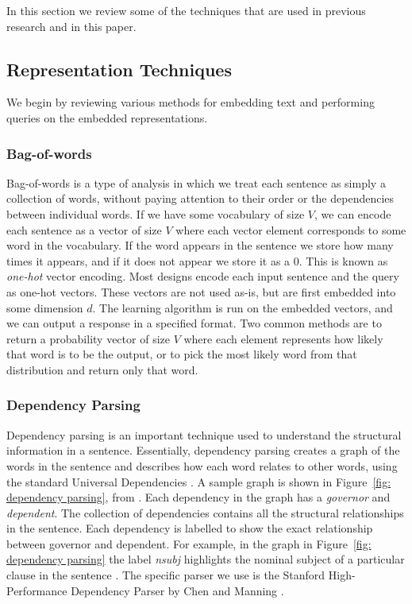 \documentclass[pageno]{final_paper}
\begin{document}
In this section we review some of the techniques that are used in previous
research and in this paper.

\subsection{Representation Techniques}
\label{Representation Techniques}

We begin by reviewing various methods for embedding text and performing queries
on the embedded representations.

\subsubsection{Bag-of-words}
\label{Bag-of-words}

Bag-of-words is a type of analysis in which we treat each sentence as simply a
collection of words, without paying attention to their order or the dependencies
between individual words. If we have some vocabulary of size $V$, we can encode
each sentence as a vector of size $V$ where each vector element corresponds to
some word in the vocabulary. If the word appears in the sentence we store how
many times it appears, and if it does not appear we store it as a 0. This is
known as \textit{one-hot} vector encoding. Most designs encode each input
sentence and the query as one-hot vectors. These vectors are not used as-is, but
are first embedded into some dimension $d$. The learning algorithm is run on the
embedded vectors, and we can output a response in a specified format. Two common
methods are to return a probability vector of size $V$ where each element
represents how likely that word is to be the output, or to pick the most likely
word from that distribution and return only that word.

\subsubsection{Dependency Parsing}
\label{Dependency Parsing}

Dependency parsing is an important technique used to understand the structural
information in a sentence. Essentially, dependency parsing creates a graph of
the words in the sentence and describes how each word relates to other words,
using the standard Universal Dependencies \cite{De2014}. A sample graph is shown
in Figure~\ref{fig: dependency parsing}, from \cite{Chen2014}. Each dependency
in the graph has a \textit{governor} and \textit{dependent}. The collection of
dependencies contains all the structural relationships in the sentence. Each
dependency is labelled to show the exact relationship between governor and
dependent. For example, in the graph in Figure~\ref{fig: dependency parsing} the
label \textit{nsubj} highlights the nominal subject of a particular clause in
the sentence \cite{De2014}. The specific parser we use is the Stanford
High-Performance Dependency Parser by Chen and Manning \cite{Chen2014}.
\end{document}

